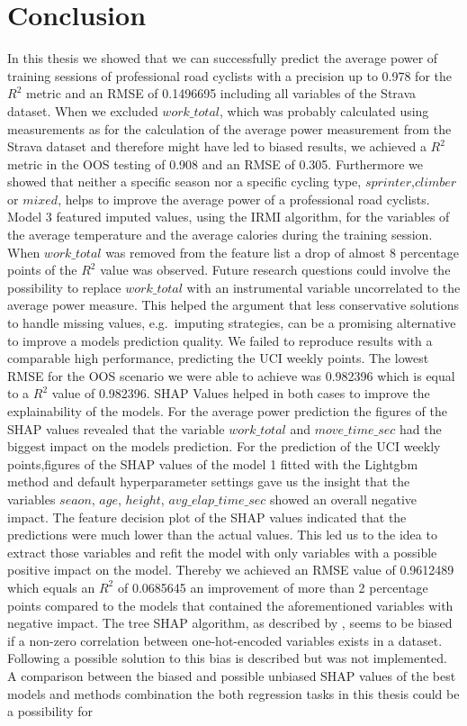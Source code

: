 \documentclass[12pt,a4paper]{article}
\begin{document}
\hypertarget{conclusion}{%
\section{Conclusion}\label{conclusion}}

In this thesis we showed that we can successfully predict the average power of training sessions of professional road cyclists with a precision up to 0.978 for the \(R^2\) metric and an RMSE of 0.1496695 including all variables of the Strava dataset. When we excluded \(work\_total\), which was probably calculated using measurements as for the calculation of the average power measurement from the Strava dataset and therefore might have led to biased results, we achieved a \(R^2\) metric in the OOS testing of 0.908 and an RMSE of 0.305. Furthermore we showed that neither a specific season nor a specific cycling type, \(sprinter\),\(climber\) or \(mixed\), helps to improve the average power of a professional road cyclists. Model 3 featured imputed values, using the IRMI algorithm, for the variables of the average temperature and the average calories during the training session. When \(work\_total\) was removed from the feature list a drop of almost 8 percentage points of the \(R^2\) value was observed. Future research questions could involve the possibility to replace \(work\_total\) with an instrumental variable uncorrelated to the average power measure. This helped the argument that less conservative solutions to handle missing values, e.g.~imputing strategies, can be a promising alternative to improve a models prediction quality. We failed to reproduce results with a comparable high performance, predicting the UCI weekly points. The lowest RMSE for the OOS scenario we were able to achieve was 0.982396 which is equal to a \(R^2\) value of 0.982396. SHAP Values helped in both cases to improve the explainability of the models. For the average power prediction the figures of the SHAP values revealed that the variable \(work\_total\) and \(move\_time\_sec\) had the biggest impact on the models prediction. For the prediction of the UCI weekly points,figures of the SHAP values of the model 1 fitted with the Lightgbm method and default hyperparameter settings gave us the insight that the variables \(seaon\), \(age\), \(height\), \(avg\_elap\_time\_sec\) showed an overall negative impact. The feature decision plot of the SHAP values indicated that the predictions were much lower than the actual values. This led us to the idea to extract those variables and refit the model with only variables with a possible positive impact on the model. Thereby we achieved an RMSE value of 0.9612489 which equals an \(R^2\) of 0.0685645 an improvement of more than 2 percentage points compared to the models that contained the aforementioned variables with negative impact. The tree SHAP algorithm, as described by \textcite{Lundberg2017}, seems to be biased if a non-zero correlation between one-hot-encoded variables exists in a dataset. Following \textcite{Amoukou2021} a possible solution to this bias is described but was not implemented. A comparison between the biased and possible unbiased SHAP values of the best models and methods combination the both regression tasks in this thesis could be a possibility for 
\end{document}
